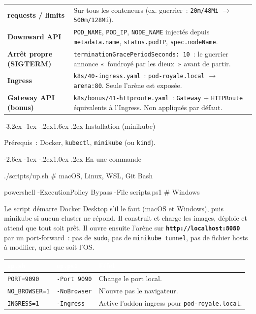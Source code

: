 \documentclass[11pt,a4paper]{article}
\makeatletter
\newcommand{\titlefont}{\sffamily\bfseries}
\renewcommand\section{\@startsection{section}{1}{\z@}%
  {-3.2ex \@plus -1ex \@minus -.2ex}{1.6ex \@plus .2ex}%
  {\titlefont\Large\color{nuit}}}
\renewcommand\subsection{\@startsection{subsection}{2}{\z@}%
  {-2.6ex \@plus -1ex \@minus -.2ex}{1.0ex \@plus .2ex}%
  {\titlefont\large\color{kube}}}
\newcommand{\code}[1]{\texttt{#1}}
\newcommand{\entete}[1]{\textcolor{white}{\sffamily\bfseries #1}}
\makeatother
\begin{document}
\begin{longtable}{L{3.5cm} L{12.0cm}}
\textbf{requests / limits} & Sur tous les conteneurs (ex.
  guerrier~: \code{20m/48Mi} $\rightarrow$ \code{500m/128Mi}).\\
\textbf{Downward API} & \code{POD\_NAME}, \code{POD\_IP}, \code{NODE\_NAME}
  injectés depuis \code{metadata.name}, \code{status.podIP},
  \code{spec.nodeName}.\\
\textbf{Arrêt propre (SIGTERM)} &
  \code{terminationGracePeriodSeconds: 10}~: le guerrier annonce «~foudroyé par
  les dieux~» avant de partir.\\
\textbf{Ingress} & \code{k8s/40-ingress.yaml}~: \code{pod-royale.local}
  $\rightarrow$ \code{arena:80}. Seule l'arène est exposée.\\
\textbf{Gateway API (bonus)} &
  \code{k8s/bonus/41-httproute.yaml}~: \code{Gateway} + \code{HTTPRoute}
  équivalents à l'Ingress. Non appliqués par défaut.\\
\bottomrule
\end{longtable}

\section{Installation (minikube)}

Prérequis~: Docker, \code{kubectl}, \code{minikube} (ou \code{kind}).

\subsection{En une commande}

\begin{Code}
./scripts/up.sh                       # macOS, Linux, WSL, Git Bash
\end{Code}

\begin{Code}
powershell -ExecutionPolicy Bypass -File scripts\up.ps1    # Windows
\end{Code}

Le script démarre Docker Desktop s'il le faut (macOS et Windows), puis minikube
si aucun cluster ne répond. Il construit et charge les images, déploie et attend
que tout soit prêt. Il ouvre ensuite l'arène sur
\textbf{\code{http://localhost:8080}} par un port-forward~: pas de \code{sudo},
pas de \code{minikube tunnel}, pas de fichier hosts à modifier, quel que soit
l'OS.

\begin{longtable}{L{4.5cm} L{3.5cm} L{7.0cm}}
\entete{\code{up.sh}} & \entete{\code{up.ps1}} & \entete{Effet}\\
\endhead
{}\code{PORT=9090} & \code{-Port 9090} & Change le port local.\\
\code{NO\_BROWSER=1} & \code{-NoBrowser} & N'ouvre pas le navigateur.\\
\code{INGRESS=1} & \code{-Ingress} & Active l'addon ingress pour
  \code{pod-royale.local}.\\
\bottomrule
\end{longtable}
\end{document}
